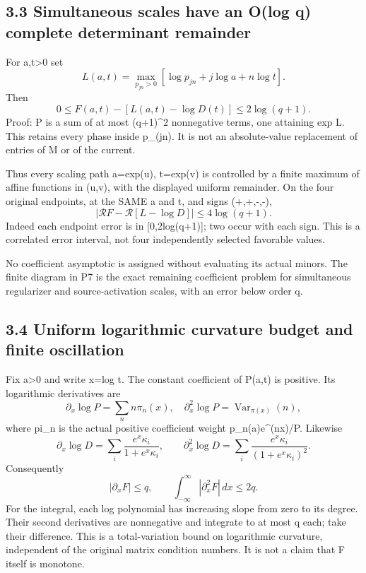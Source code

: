 \subsection{3.3 Simultaneous scales have an O(log q) complete determinant remainder}\label{simultaneous-scales-have-an-olog-q-complete-determinant-remainder}

For a,t\textgreater0 set \[
 L(a,t)=\max_{p_{jn}>0}[\log p_{jn}+j\log a+n\log t].
\] Then \[
 \boxed{0\le F(a,t)-[L(a,t)-\log D(t)]
 \le2\log(q+1).}\tag{P7}
\] Proof: P is a sum of at most (q+1)\^{}2 nonnegative terms, one attaining exp L. This retains every phase inside p\_(jn). It is not an absolute-value replacement of entries of M or of the current.

Thus every scaling path a=exp(u), t=exp(v) is controlled by a finite maximum of affine functions in (u,v), with the displayed uniform remainder. On the four original endpoints, at the SAME a and t, and signs (+,+,-,-), \[
 \boxed{\left|\mathcal R F-
 \mathcal R[L-\log D]\right|\le4\log(q+1).}\tag{P8}
\] Indeed each endpoint error is in {[}0,2log(q+1){]}; two occur with each sign. This is a correlated error interval, not four independently selected favorable values.

No coefficient asymptotic is assigned without evaluating its actual minors. The finite diagram in P7 is the exact remaining coefficient problem for simultaneous regularizer and source-activation scales, with an error below order q.

\subsection{3.4 Uniform logarithmic curvature budget and finite oscillation}\label{uniform-logarithmic-curvature-budget-and-finite-oscillation}

Fix a\textgreater0 and write x=log t. The constant coefficient of P(a,t) is positive. Its logarithmic derivatives are \[
 \partial_x\log P=\sum_n n\pi_n(x),\quad
 \partial_x^2\log P=\operatorname{Var}_{\pi(x)}(n),
\] where pi\_n is the actual positive coefficient weight p\_n(a)e\^{}(nx)/P. Likewise \[
 \partial_x\log D=\sum_i\frac{e^x\kappa_i}{1+e^x\kappa_i},\qquad
 \partial_x^2\log D=\sum_i\frac{e^x\kappa_i}{(1+e^x\kappa_i)^2}.
\] Consequently \[
 \boxed{|\partial_xF|\le q,\qquad
 \int_{-\infty}^{\infty}|\partial_x^2F|\,dx\le2q.}\tag{P9}
\] For the integral, each log polynomial has increasing slope from zero to its degree. Their second derivatives are nonnegative and integrate to at most q each; take their difference. This is a total-variation bound on logarithmic curvature, independent of the original matrix condition numbers. It is not a claim that F itself is monotone.

